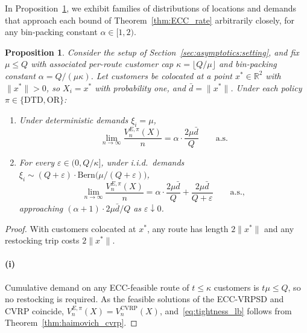\documentclass{article}
\newtheorem{proposition}{Proposition}
\begin{document}
{In Proposition~\ref{prop:ECC_tightness}, we exhibit families of distributions of locations and demands that approach each bound of Theorem~\ref{thm:ECC_rate} arbitrarily closely, for any bin-packing constant $\alpha \in [1,2)$.

\begin{proposition}\label{prop:ECC_tightness}
    Consider the setup of Section~\ref{sec:asymptotics:setting}, and fix $\mu \leq Q$ with associated per-route customer cap $\kappa = \lfloor Q/\mu \rfloor$ and bin-packing constant $\alpha = Q/(\mu\kappa)$. Let customers be colocated at a point $x^* \in \mathbb{R}^2$ with $\|x^*\| > 0$, so $X_i = x^*$ with probability one, and $\bar d = \|x^*\|$. Under each policy $\pi \in \{\text{DTD}, \text{OR}\}$:
    \begin{enumerate}
        \item[(i)] Under deterministic demands $\xi_i = \mu$,
        \begin{equation}\label{eq:tightness_lb}
            \lim_{n \to \infty} \frac{V^{E, \pi}_n(X)}{n} = \alpha \cdot \frac{2\mu\bar d}{Q} \qquad \text{a.s.}
        \end{equation}
        \item[(ii)] For every $\varepsilon \in (0, Q/\kappa]$, under i.i.d.\ demands $\xi_i \sim (Q+\varepsilon) \cdot \mathrm{Bern}\bigl(\mu/(Q+\varepsilon)\bigr)$,
        \begin{equation}\label{eq:tightness_ub}
            \lim_{n \to \infty} \frac{V^{E, \pi}_n(X)}{n} = \alpha \cdot \frac{2\mu\bar d}{Q} + \frac{2\mu\bar d}{Q + \varepsilon} \qquad \text{a.s.},
        \end{equation}
        approaching $(\alpha + 1) \cdot 2\mu\bar d/Q$ as $\varepsilon \downarrow 0$.
    \end{enumerate}
\end{proposition}

\begin{proof}
    With customers colocated at $x^*$, any route has length $2\|x^*\|$ and any restocking trip costs $2\|x^*\|$.

    \paragraph{(i)} Cumulative demand on any ECC-feasible route of $t \leq \kappa$ customers is $t\mu \leq Q$, so no restocking is required. As the feasible solutions of the ECC-VRPSD and CVRP coincide, $V^{E, \pi}_n(X) = V^{\text{CVRP}}_n(X)$, and~\eqref{eq:tightness_lb} follows from Theorem~\ref{thm:haimovich_cvrp}.


\end{proof}}
\end{document}
